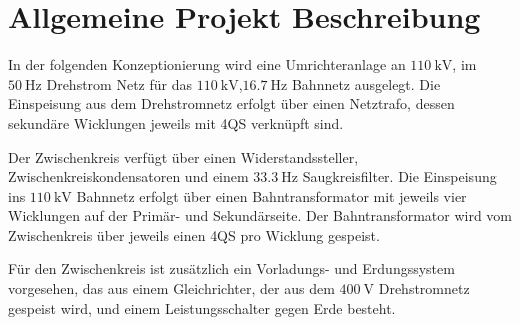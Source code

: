 \clearpage
\section{Allgemeine Projekt Beschreibung}
In der folgenden Konzeptionierung wird eine Umrichteranlage an $\SI{110}{\kV}$, im $\SI{50}{\Hz}$ Drehstrom Netz für das $\SI{110}{\kV}$,$\SI{16.7}{\Hz}$ Bahnnetz ausgelegt.
Die Einspeisung aus dem Drehstromnetz erfolgt über einen Netztrafo, dessen sekundäre Wicklungen jeweils mit \ac{4QS} verknüpft sind. 

Der Zwischenkreis verfügt über einen Widerstandssteller, Zwischenkreiskondensatoren und einem $\SI{33.3}{\Hz}$ Saugkreisfilter. 
Die Einspeisung ins $\SI{110}{\kV}$ Bahnnetz erfolgt über einen Bahntransformator mit jeweils vier Wicklungen auf der Primär- und Sekundärseite. 
Der Bahntransformator wird vom Zwischenkreis über jeweils einen \ac{4QS} pro Wicklung gespeist. 

Für den Zwischenkreis ist zusätzlich ein Vorladungs- und Erdungssystem vorgesehen, das aus einem Gleichrichter, der aus dem $\SI{400}{\V}$ Drehstromnetz gespeist wird, und einem Leistungsschalter gegen Erde besteht.

